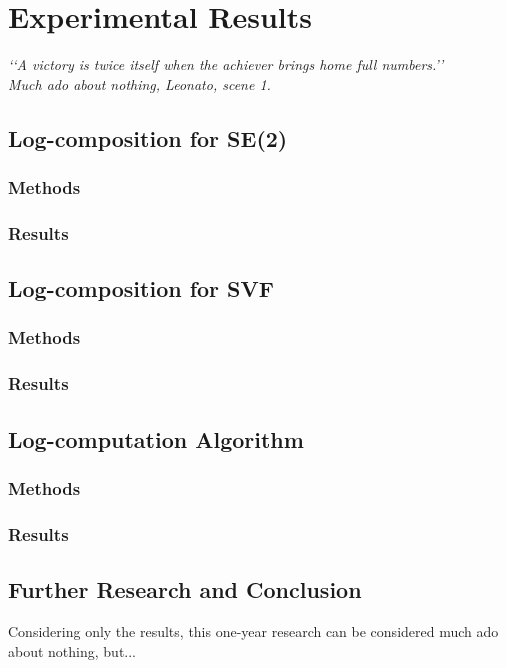 \chapter{Experimental Results}\label{ch:results}

\begin{flushright}
	\emph{\lq\lq A victory is twice itself when the achiever brings home full numbers.\rq\rq \\
		       \emph{Much ado about nothing}, Leonato, scene 1.}
\end{flushright}





\section{Log-composition for SE(2)}


\subsection{Methods}

\subsection{Results}



\section{Log-composition for SVF}

\subsection{Methods}

\subsection{Results}

\section{Log-computation Algorithm}

\subsection{Methods}

\subsection{Results}

\section{Further Research and Conclusion}\label{ch:conclusions}


Considering only the results, this one-year research can be considered much ado about nothing, but...
